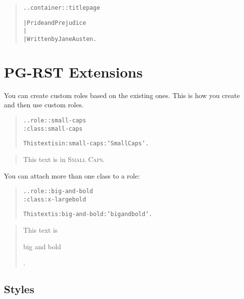\documentclass[a5paper]{book}
\begin{document}
\begin{german}
\begin{quote}
\begin{alltt}
.. container:: titlepage

   | Pride and Prejudice
   |
   | Written by Jane Austen.
\end{alltt}
\end{quote}

\cleardoublepage
\label{pg-rst-extensions}%
\hypertarget{pg-rst-extensions}{}%
%
\chapter*{PG-RST Extensions}


You can create custom roles based on the existing ones. This is how
you create and then use custom roles.\par

\begin{quote}
\begin{alltt}
.. role:: small-caps
   :class: small-caps

This text is in :small-caps:`Small Caps`.
\end{alltt}
\end{quote}

\begin{quotation}\noindent
\begin{container}
This text is in {\scshape{Small Caps}}.\par
\end{container}
\end{quotation}

{\noindent}You can attach more than one class to a role:\par

\begin{quote}
\begin{alltt}
.. role:: big-and-bold
   :class: x-large bold

This text is :big-and-bold:`big and bold`.
\end{alltt}
\end{quote}

\begin{quotation}\noindent
\begin{container}
This text is {\bfseries{{\LARGE\strut{big and bold}}}}.\par
\end{container}
\end{quotation}

%
\label{styles}%
\hypertarget{styles}{}%
%
\section*{{\noindent}Styles}



\end{german}
\end{document}
